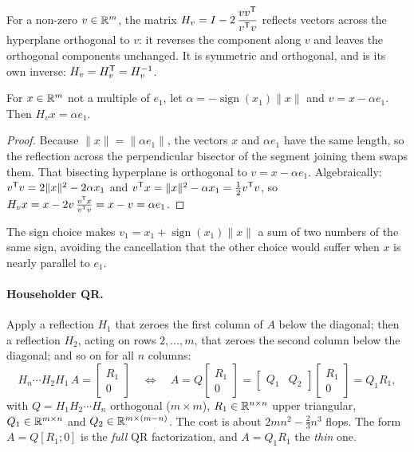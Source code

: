 \begin{definition}
For a non-zero $v \in \mathbb{R}^m$, the matrix $H_v = I - 2\, \dfrac{v v^{\mathsf{T}}}{v^{\mathsf{T}} v}$ reflects vectors across the hyperplane orthogonal to $v$:
it reverses the component along $v$ and leaves the orthogonal components unchanged. It is symmetric and orthogonal, and is its own
inverse: $H_v = H_v^{\mathsf{T}} = H_v^{-1}$.
\end{definition}

\begin{proposition}
For $x \in \mathbb{R}^m$ not a multiple of $e_1$, let $\alpha = -\operatorname{sign}(x_1)\|x\|$ and $v = x - \alpha e_1$. Then $H_vx = \alpha e_1$.
\end{proposition}
\begin{proof}
Because $\|x\| = \|\alpha e_1\|$, the vectors $x$ and $\alpha e_1$ have the same length, so the reflection across the
perpendicular bisector of the segment joining them swaps them. That bisecting hyperplane is orthogonal to $v = x - \alpha e_1$.
Algebraically: $v^{\mathsf{T}} v = 2\|x\|^2 - 2\alpha x_1$ and $v^{\mathsf{T}} x = \|x\|^2 - \alpha x_1 = \tfrac12v^{\mathsf{T}} v$, so
$H_vx = x - 2v\,\frac{v^{\mathsf{T}} x}{v^{\mathsf{T}} v} = x - v = \alpha e_1$.
\end{proof}

The sign choice makes $v_1 = x_1 + \operatorname{sign}(x_1)\|x\|$ a sum of two numbers of the same sign, avoiding the cancellation
that the other choice would suffer when $x$ is nearly parallel to $e_1$.

\paragraph{Householder QR.} Apply a reflection $H_1$ that zeroes the first column of $A$ below the diagonal; then a reflection $H_2$,
acting on rows $2, \dots, m$, that zeroes the second column below the diagonal; and so on for all $n$ columns:
\begin{equation}
  H_n \cdots H_2 H_1\, A = \begin{bmatrix} R_1 \\ 0 \end{bmatrix}
  \quad\Longleftrightarrow\quad
  A = Q \begin{bmatrix} R_1 \\ 0 \end{bmatrix} = \begin{bmatrix} Q_1 & Q_2 \end{bmatrix}
      \begin{bmatrix} R_1 \\ 0 \end{bmatrix} = Q_1 R_1,
  \label{eq:qr}
\end{equation}
with $Q = H_1 H_2\cdots H_n$ orthogonal ($m\times m$), $R_1 \in \mathbb{R}^{n\times n}$ upper triangular, $Q_1 \in \mathbb{R}^{m\times n}$ and $Q_2 \in \mathbb{R}^{m\times(m-n)}$. The
cost is about $2mn^2 - \tfrac23 n^3$ flops. The form $A = Q[R_1; 0]$ is the \emph{full} QR factorization, and $A = Q_1R_1$ the
\emph{thin} one.

